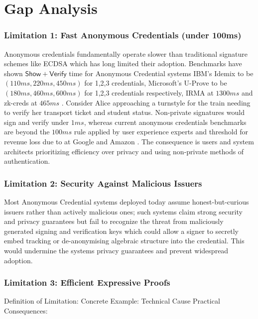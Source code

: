 \section{Gap Analysis}

\subsubsection{Limitation 1: Fast Anonymous Credentials (under 100ms) }

Anonymous credentials fundamentally operate slower than traditional signature schemes like ECDSA which has long limited their adoption. Benchmarks \cite{habib_evaluation_2016} have shown $\mathsf{Show + Verify}$ time for Anonymous Credential systems IBM's Idemix to be $(110ms, 220ms, 450ms)$ for 1,2,3 credentials, Microsoft's U-Prove to be $(180ms, 460ms, 600ms)$ for 1,2,3 credentials respectively, IRMA \cite{fischer-hubner_towards_2013} at $1300ms$ and zk-creds at $465ms$ \cite{rosenberg_zk-creds_2022}. Consider Alice approaching a turnstyle for the train needing to verify her transport ticket and student status. Non-private signatures would sign and verify under $1ms$, whereas current anonymous credentials benchmarks are beyond the $100ms$ rule applied by user experience experts \cite{jakob_nielsen_powers_2009} and threshold for revenue loss due to  at Google and Amazon \cite{linden_geeking_2006}. The consequence is users and system architects prioritizing efficiency over privacy and using non-private methods of authentication. 


\subsubsection{Limitation 2: Security Against Malicious Issuers}
Most Anonymous Credential systems deployed today assume honest-but-curious issuers rather than actively malicious ones; such systems claim strong security and privacy guarantees but fail to recognize the threat from maliciously generated signing and verification keys which could allow a signer to secretly embed tracking or de-anonymising algebraic structure into the credential. This would undermine the systems privacy guarantees and prevent widespread adoption. 


\subsubsection{Limitation 3: Efficient Expressive Proofs}
Definition of Limitation: 
Concrete Example:
Technical Cause
Practical Consequences:


